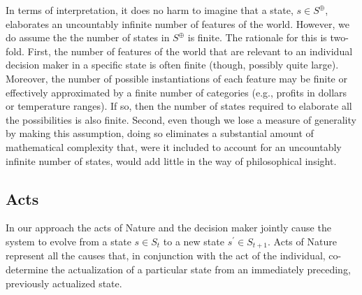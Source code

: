 \documentclass[
11pt,
titlepage,
reqno,
]{article}%
\theoremstyle{definition}
\begin{document}
In terms of interpretation, it does no harm to imagine that a state, $s\in S^\oplus$, elaborates an uncountably infinite number of features of the world.
However,  we do assume the the number of states in $S^\oplus$ is finite.
The rationale for this is two-fold.
First, the number of features of the world that are relevant to an individual decision maker in a specific state is often finite (though, possibly quite large).
Moreover, the number of possible instantiations of each feature may be finite or effectively approximated by a finite number of  categories (e.g., profits in dollars or temperature ranges).
If so, then the number of states required to elaborate all the possibilities is also finite.
Second, even  though we lose a measure of generality by making this assumption, doing so eliminates a substantial amount of mathematical complexity that, were it included to account for an uncountably infinite number of states, would add little in the way of philosophical insight.

	
	
	
\subsection{Acts}\label{sec:acts}
	
In our approach the acts of Nature and the decision maker jointly cause the system to evolve from a state $s\in S_t$ to a new state $s^\prime\in S_{t+1}$.
Acts of Nature represent all the causes that, in conjunction with the act of the individual, co-determine the actualization of a particular state from an immediately preceding, previously actualized state.
	
\end{document}
